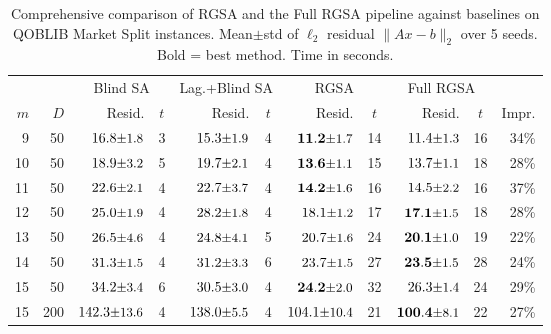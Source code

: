 \begin{table}[htbp]
\centering
\caption{Comprehensive comparison of RGSA and the Full RGSA pipeline against baselines on QOBLIB Market Split instances.  Mean$\pm$std of $\ell_2$ residual $\|Ax-b\|_2$ over 5 seeds.  Bold = best method.  Time in seconds.}
\label{tab:comprehensive}
\footnotesize
\setlength{\tabcolsep}{4pt}
\begin{tabular}{rr|rc|rc|rc|rc|r}
\toprule
 & & \multicolumn{2}{c|}{Blind SA} & \multicolumn{2}{c|}{Lag.+Blind SA} & \multicolumn{2}{c|}{RGSA} & \multicolumn{2}{c|}{Full RGSA} & \\
$m$ & $D$ & Resid. & $t$ & Resid. & $t$ & Resid. & $t$ & Resid. & $t$ & Impr. \\
\midrule
9 & 50 & $16.8\text{\small$\pm$1.8}$ & 3 & $15.3\text{\small$\pm$1.9}$ & 4 & $\mathbf{11.2\text{\small$\pm$1.7}}$ & 14 & $11.4\text{\small$\pm$1.3}$ & 16 & 34\% \\
10 & 50 & $18.9\text{\small$\pm$3.2}$ & 5 & $19.7\text{\small$\pm$2.1}$ & 4 & $\mathbf{13.6\text{\small$\pm$1.1}}$ & 15 & $13.7\text{\small$\pm$1.1}$ & 18 & 28\% \\
11 & 50 & $22.6\text{\small$\pm$2.1}$ & 4 & $22.7\text{\small$\pm$3.7}$ & 4 & $\mathbf{14.2\text{\small$\pm$1.6}}$ & 16 & $14.5\text{\small$\pm$2.2}$ & 16 & 37\% \\
12 & 50 & $25.0\text{\small$\pm$1.9}$ & 4 & $28.2\text{\small$\pm$1.8}$ & 4 & $18.1\text{\small$\pm$1.2}$ & 17 & $\mathbf{17.1\text{\small$\pm$1.5}}$ & 18 & 28\% \\
13 & 50 & $26.5\text{\small$\pm$4.6}$ & 4 & $24.8\text{\small$\pm$4.1}$ & 5 & $20.7\text{\small$\pm$1.6}$ & 24 & $\mathbf{20.1\text{\small$\pm$1.0}}$ & 19 & 22\% \\
14 & 50 & $31.3\text{\small$\pm$1.5}$ & 4 & $31.2\text{\small$\pm$3.3}$ & 6 & $23.7\text{\small$\pm$1.5}$ & 27 & $\mathbf{23.5\text{\small$\pm$1.5}}$ & 28 & 24\% \\
15 & 50 & $34.2\text{\small$\pm$3.4}$ & 6 & $30.5\text{\small$\pm$3.0}$ & 4 & $\mathbf{24.2\text{\small$\pm$2.0}}$ & 32 & $26.3\text{\small$\pm$1.4}$ & 24 & 29\% \\
15 & 200 & $142.3\text{\small$\pm$13.6}$ & 4 & $138.0\text{\small$\pm$5.5}$ & 4 & $104.1\text{\small$\pm$10.4}$ & 21 & $\mathbf{100.4\text{\small$\pm$8.1}}$ & 22 & 27\% \\
\bottomrule
\end{tabular}
\end{table}
